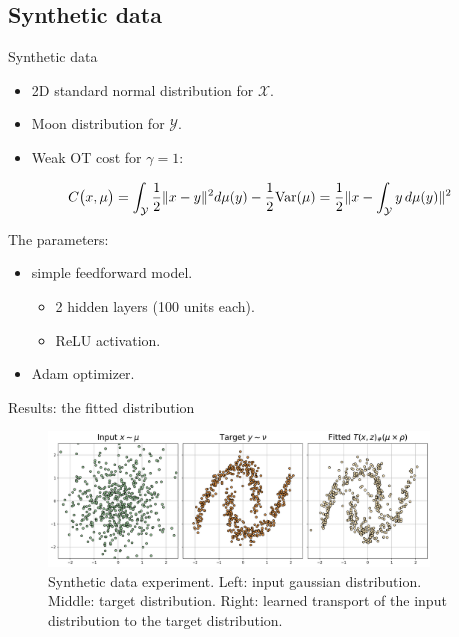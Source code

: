\documentclass{beamer}
\begin{document}
\subsection{Synthetic data}
\begin{frame}{Synthetic data}
\begin{itemize}
    \item 2D standard normal distribution for $\mathcal{X}$.
    \item Moon distribution for $\mathcal{Y}$.
    \item Weak OT cost for $\gamma = 1$:
\end{itemize}
\begin{equation}
    C\big{(}x,\mu\big{)}=\int_{\mathcal{Y}}\frac{1}{2}\|x-y\|^{2}d\mu(y)-\frac{1}{2} \text{Var}(\mu)=\frac{1}{2}\|x-\int_{\mathcal{Y}}y\,d\mu(y)\|^{2}
    \label{eq:toy_cost}
\end{equation}

The parameters:
\begin{itemize}
    \item simple feedforward model.
    \begin{itemize}
        \item 2 hidden layers (100 units each).
        \item ReLU activation.
    \end{itemize}
    \item Adam optimizer.
\end{itemize}
\end{frame}

\begin{frame}{Results: the fitted distribution}
    \begin{figure}[H]
        \centering
        \includegraphics[width=0.9\textwidth]{figures/toy_1.png}
        \caption{Synthetic data experiment. Left: input gaussian distribution. Middle: target distribution. Right: learned transport of the input distribution to the target distribution.}
        \label{fig:toy_1}
    \end{figure}
\end{frame}
\end{document}
